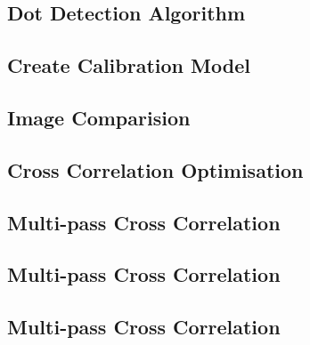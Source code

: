 \subsection{Dot Detection Algorithm}
 \label{code:2.1}

\subsection{Create Calibration Model}
 \label{code:2.2}

\subsection{Image Comparision}
 \label{code:2.3}

\subsection{Cross Correlation Optimisation}
 \label{code:2.4}

\subsection{Multi-pass Cross Correlation}
 \label{code:2.5}

\subsection{Multi-pass Cross Correlation}
 \label{code:2.6}

\subsection{Multi-pass Cross Correlation}
 \label{code:2.7}

